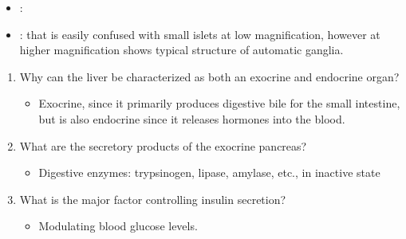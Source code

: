 \begin{itemize}
  \begin{multicols}{2}
  \begin{itemize}
    \item {}:
    
    \begin{center}
    \end{center}
    
    \item {}: that is easily confused with small islets at low magnification, however at higher magnification shows typical structure of automatic ganglia.
    
    \begin{center}
    \end{center}
    
    
    
  \end{itemize}
  \end{multicols}
  
  \begin{enumerate}\color{minor}
    \item Why can the liver be characterized as both an exocrine and endocrine organ?
      \begin{itemize}\color{text}
        \item Exocrine, since it primarily produces digestive bile for the small intestine, but is also endocrine since it releases hormones into the blood.
      \end{itemize}
    \item What are the secretory products of the exocrine pancreas?
      \begin{itemize}\color{text}
        \item Digestive enzymes: trypsinogen, lipase, amylase, etc., in inactive state
      \end{itemize}
    \item What is the major factor controlling insulin secretion?
      \begin{itemize}\color{text}
        \item Modulating blood glucose levels.
      \end{itemize}
  \end{enumerate}


\end{itemize}
